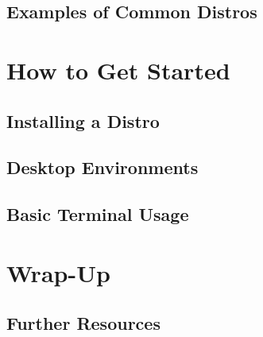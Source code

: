     \subsection{Examples of Common Distros}
    
    \section{How to Get Started}
    \subsection{Installing a Distro}
    \subsection{Desktop Environments}
    \subsection{Basic Terminal Usage}
    
    \section{Wrap-Up}
    \subsection{Further Resources}
	
